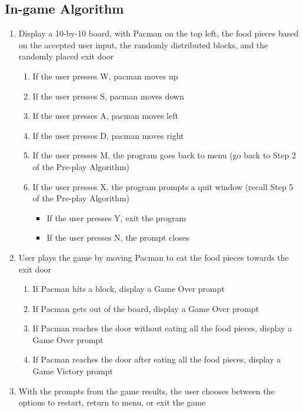 \subsection{In-game Algorithm}

\begin{enumerate}
    \item Display a 10-by-10 board, with Pacman on the top left, the food pieces based on the accepted user input, the randomly distributed blocks, and the randomly placed exit door
        \begin{enumerate}[label=\alph*]
            \item If the user presses W, pacman moves up
            \item If the user presses S, pacman moves down
            \item If the user presses A, pacman moves left
            \item If the user presses D, pacman moves right
            \item If the user presses M, the program goes back to menu (go back to Step 2 of the Pre-play Algorithm)
            \item If the user presses X, the program prompts a quit window (recall Step 5 of the Pre-play Algorithm)
            \begin{itemize}[label={}]
                \item If the user presses Y, exit the program
                \item If the user presses N, the prompt closes
            \end{itemize}
        \end{enumerate}
    \item User plays the game by moving Pacman to eat the food pieces towards the exit door
        \begin{enumerate}[label=\alph*]
            \item If Pacman hits a block, display a Game Over prompt
            \item If Pacman gets out of the board, display a Game Over prompt
            \item If Pacman reaches the door without eating all the food pieces, display a Game Over prompt
            \item If Pacman reaches the door after eating all the food pieces, display a Game Victory prompt
        \end{enumerate}
    \item With the prompts from the game results, the user chooses between the options to restart, return to menu, or exit the game

\end{enumerate}

